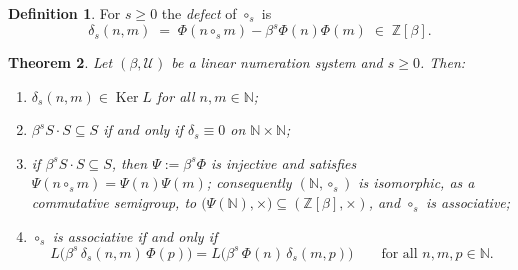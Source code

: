 \documentclass[11pt,reqno]{amsart}
\theoremstyle{plain}
\newtheorem{theorem}{Theorem}[section]
\theoremstyle{definition}
\newtheorem{definition}[theorem]{Definition}
\newcommand{\Z}{\mathbb{Z}}
\newcommand{\N}{\mathbb{N}}
\newcommand{\Uu}{\mathcal{U}}
\newcommand{\Ker}{\operatorname{Ker}}
\begin{document}
\begin{definition}\label{def:defect}
For $s\ge0$ the \emph{defect} of $\circ_{s}$ is
\[
  \delta_{s}(n,m)\;=\;\Phi(n\circ_{s}m)-\beta^{s}\Phi(n)\Phi(m)\;\in\;\Z[\beta].
\]
\end{definition}

\begin{theorem}\label{thm:criterion}
Let $(\beta,\Uu)$ be a linear numeration system and $s\ge0$. Then:
\begin{enumerate}
\item[(i)] $\delta_{s}(n,m)\in\Ker L$ for all $n,m\in\N$;
\item[(ii)] $\beta^{s}S\cdot S\subseteq S$ if and only if $\delta_{s}\equiv0$ on $\N\times\N$;
\item[(iii)] if $\beta^{s}S\cdot S\subseteq S$, then $\Psi:=\beta^{s}\Phi$ is injective and satisfies
      $\Psi(n\circ_{s}m)=\Psi(n)\Psi(m)$; consequently $(\N,\circ_{s})$ is isomorphic, as a
      commutative semigroup, to $\bigl(\Psi(\N),\times\bigr)\subseteq(\Z[\beta],\times)$, and
      $\circ_{s}$ is associative;
\item[(iv)] $\circ_{s}$ is associative if and only if
      \begin{equation}\label{eq:obstruction}
        L\bigl(\beta^{s}\,\delta_{s}(n,m)\,\Phi(p)\bigr)
        =L\bigl(\beta^{s}\,\Phi(n)\,\delta_{s}(m,p)\bigr)
        \qquad\text{for all }n,m,p\in\N .
      \end{equation}
\end{enumerate}
\end{theorem}
\end{document}
